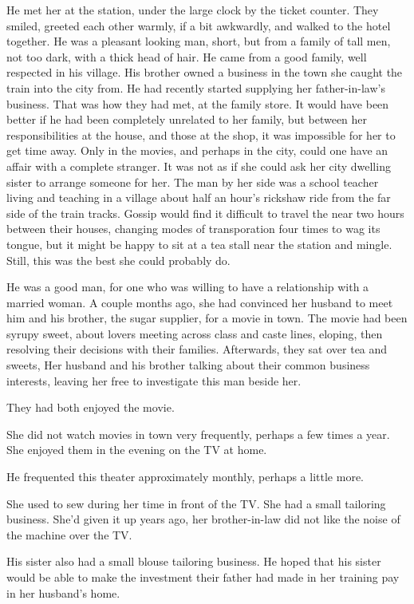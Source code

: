 \documentclass{article}
\begin{document}
He met her at the station, under the large clock by the ticket counter. They smiled, greeted each other warmly, if a bit awkwardly, and walked to the hotel together. He was a pleasant looking man, short, but from a family of tall men, not too dark, with a thick head of hair. He came from a good family, well respected in his village. His brother owned a business in the town she caught the train into the city from. He had recently started supplying her father-in-law's business. That was how they had met, at the family store. It would have been better if he had been completely unrelated to her family, but between her responsibilities at the house, and those at the shop, it was impossible for her to get time away. Only in the movies, and perhaps in the city, could one have an affair with a complete stranger. It was not as if she could ask her city dwelling sister to arrange someone for her. The man by her side was a school teacher living and teaching in a village about half an hour's rickshaw ride from the far side of the train tracks. Gossip would find it difficult to travel the near two hours between their houses, changing modes of transporation four times to wag its tongue, but it might be happy to sit at a tea stall near the station and mingle. Still, this was the best she could probably do.

He was a good man, for one who was willing to have a relationship with a married woman. A couple months ago, she had convinced her husband to meet him and his brother, the sugar supplier, for a movie in town. The movie had been syrupy sweet, about lovers meeting across class and caste lines, eloping, then resolving their decisions with their families. Afterwards, they sat over tea and sweets, Her husband and his brother talking about their common business interests, leaving her free to investigate this man beside her. 

They had both enjoyed the movie. 

She did not watch movies in town very frequently, perhaps a few times a year. She enjoyed them in the evening on the TV at home. 

He frequented this theater approximately monthly, perhaps a little more. 

She used to sew during her time in front of the TV. She had a small tailoring business. She'd given it up years ago, her brother-in-law did not like the noise of the machine over the TV.

His sister also had a small blouse tailoring business. He hoped that his sister would be able to make the investment their father had made in her training pay in her husband's home.
\end{document}
